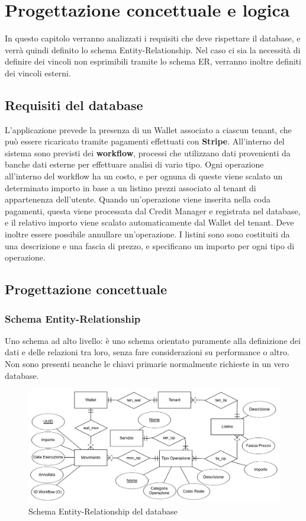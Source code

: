 \chapter{Progettazione concettuale e logica}
In questo capitolo verranno analizzati i requisiti che deve rispettare il database, e verr\`a quindi definito lo schema Entity-Relationship. Nel caso ci sia la necessit\`a
di definire dei vincoli non esprimibili tramite lo schema ER, verranno inoltre definiti dei vincoli esterni.
\section{Requisiti del database}
L'applicazione prevede la presenza di un Wallet associato a ciascun tenant, che pu\`o essere ricaricato tramite pagamenti effettuati con \textbf{Stripe}.
All'interno del sistema sono previsti dei \textbf{workflow}, processi che utilizzano dati provenienti da banche dati esterne per effettuare analisi di vario tipo.
Ogni operazione all'interno del workflow ha un costo, e per ognuna di queste viene scalato un determinato importo in base a un listino prezzi associato al tenant di appartenenza dell'utente.
Quando un'operazione viene inserita nella coda pagamenti, questa viene processata dal Credit Manager e registrata nel database, e il relativo importo viene scalato automaticamente dal Wallet del tenant.
Deve inoltre essere possibile annullare un'operazione. I listini sono sono costituiti da una descrizione e una fascia di prezzo, e specificano un importo per ogni tipo di operazione.

\section{Progettazione concettuale}
\subsection{Schema Entity-Relationship}
Uno schema ad alto livello: \`e uno schema orientato puramente alla definizione dei dati e delle relazioni tra loro, senza fare considerazioni su performance o altro.
Non sono presenti neanche le chiavi primarie normalmente richieste in un vero database.
\begin{figure}[H]
  \centering
  \includegraphics[width=12cm]{images/db-diagrams/er-diagram-concept.png}
  \caption{Schema Entity-Relationship del database}
\end{figure}

